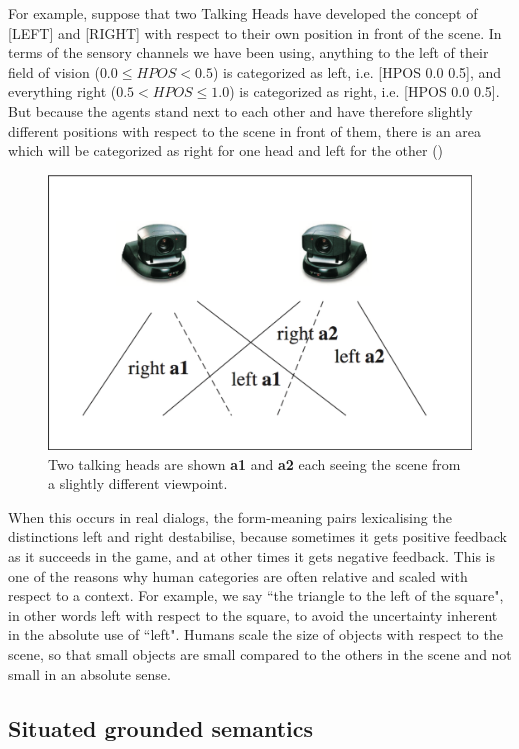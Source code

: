 For example, suppose that two Talking Heads have developed the 
concept of [LEFT] and [RIGHT] with respect to their own position 
in front of the scene. In terms of the sensory 
channels we have been using, anything to the left of their field  
of vision ($0.0 \le HPOS < 0.5$) is categorized as
left, i.e. [HPOS 0.0 0.5], and everything right  
($0.5 < HPOS \le 1.0$) is categorized as right, 
i.e. [HPOS 0.0 0.5]. But because the
agents stand next to each other and have therefore 
slightly different positions with respect to the 
scene in front of them, there is an area which will 
be categorized as right for one head and left for the other ()
\begin{figure}[htbp]
  \centerline{\includegraphics[width=.65\textwidth]{chap2/figs/left-right}}
\caption{\label{left-right} Two talking heads are shown {\bf a1} and 
{\bf a2} each seeing the scene from a slightly different viewpoint.}
\end{figure}
When this occurs in real dialogs, the form-meaning 
pairs lexicalising the distinctions left and right destabilise,
because sometimes it gets positive feedback as 
it succeeds in the game, and at other times it 
gets negative feedback. 
This is one of the reasons why human categories are often 
relative and scaled with respect to a context.
For example, we say ``the triangle to the left of the square", in 
other words left with respect to the square, to avoid the uncertainty
inherent in the absolute use of ``left". Humans scale the size 
of objects with respect to the scene, so that small 
objects are small compared to the others in the scene 
and not small in an absolute sense. 

\subsection{Situated grounded semantics}

